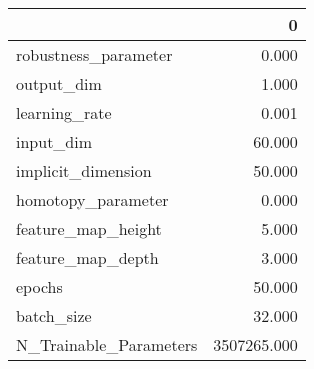 \begin{tabular}{lr}
\toprule
{} &            0 \\
\midrule
robustness\_parameter   &        0.000 \\
output\_dim             &        1.000 \\
learning\_rate          &        0.001 \\
input\_dim              &       60.000 \\
implicit\_dimension     &       50.000 \\
homotopy\_parameter     &        0.000 \\
feature\_map\_height     &        5.000 \\
feature\_map\_depth      &        3.000 \\
epochs                 &       50.000 \\
batch\_size             &       32.000 \\
N\_Trainable\_Parameters &  3507265.000 \\
\bottomrule
\end{tabular}
